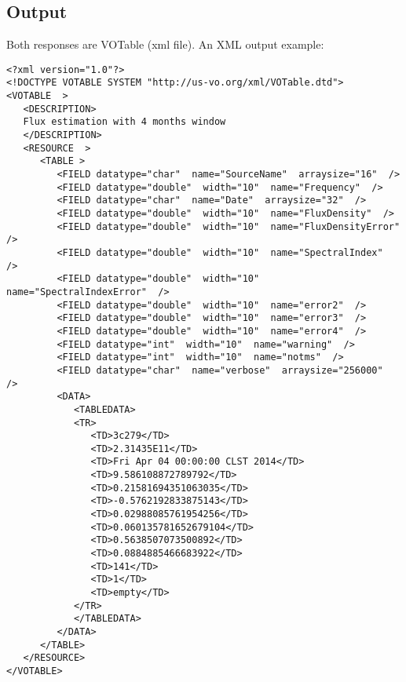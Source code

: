 \documentclass[10pt]{article}
\begin{document}
\subsection{Output}
\noindent Both responses are VOTable (xml file). An XML output example:
\lstset{language=XML}
\begin{lstlisting}
<?xml version="1.0"?>
<!DOCTYPE VOTABLE SYSTEM "http://us-vo.org/xml/VOTable.dtd">
<VOTABLE  >
   <DESCRIPTION>
   Flux estimation with 4 months window
   </DESCRIPTION>
   <RESOURCE  >
      <TABLE >
         <FIELD datatype="char"  name="SourceName"  arraysize="16"  />
         <FIELD datatype="double"  width="10"  name="Frequency"  />
         <FIELD datatype="char"  name="Date"  arraysize="32"  />
         <FIELD datatype="double"  width="10"  name="FluxDensity"  />
         <FIELD datatype="double"  width="10"  name="FluxDensityError"  />
         <FIELD datatype="double"  width="10"  name="SpectralIndex"  />
         <FIELD datatype="double"  width="10"  name="SpectralIndexError"  />
         <FIELD datatype="double"  width="10"  name="error2"  />
         <FIELD datatype="double"  width="10"  name="error3"  />
         <FIELD datatype="double"  width="10"  name="error4"  />
         <FIELD datatype="int"  width="10"  name="warning"  />
         <FIELD datatype="int"  width="10"  name="notms"  />
         <FIELD datatype="char"  name="verbose"  arraysize="256000"  />
         <DATA>
            <TABLEDATA>
            <TR>
               <TD>3c279</TD>
               <TD>2.31435E11</TD>
               <TD>Fri Apr 04 00:00:00 CLST 2014</TD>
               <TD>9.586108872789792</TD>
               <TD>0.21581694351063035</TD>
               <TD>-0.5762192833875143</TD>
               <TD>0.02988085761954256</TD>
               <TD>0.060135781652679104</TD>
               <TD>0.5638507073500892</TD>
               <TD>0.0884885466683922</TD>
               <TD>141</TD>
               <TD>1</TD>
               <TD>empty</TD>
            </TR>
            </TABLEDATA>
         </DATA>
      </TABLE>
   </RESOURCE>
</VOTABLE>
\end{lstlisting}
\end{document}
